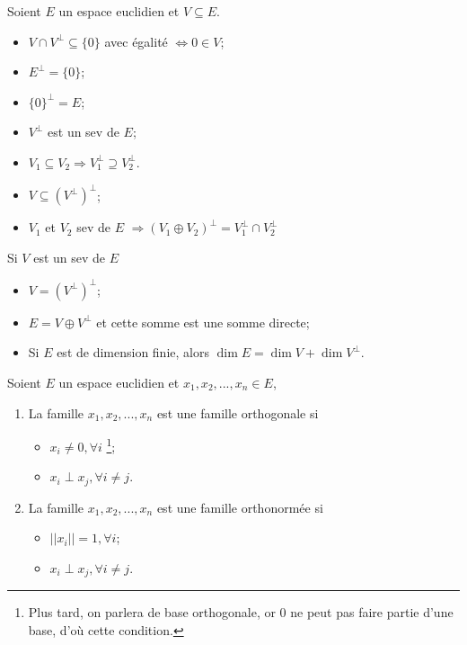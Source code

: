 \begin{myprop}
	Soient $E$ un espace euclidien et $V \subseteq E$.
	\begin{itemize}
		\item $V \cap V^{\perp} \subseteq \{0\}$ avec égalité $\iff 0 \in V$;
		\item $E^{\perp} = \{0\}$;
		\item $\{0\}^{\perp} = E$;
		\item $V^{\perp}$ est un sev de $E$;
		\item $V_1 \subseteq V_2 \Rightarrow V_1^{\perp} \supseteq V_2^{\perp}$.
		\item $V \subseteq \left( V^{\perp} \right) ^{\perp}$;
		\item $V_1$ et $V_2$ sev de $E$ $\Rightarrow (V_1 \oplus V_2)^{\perp} = V_1^{\perp}
					\cap V_2^{\perp}$
	\end{itemize}
	Si $V$ est un sev de $E$
	\begin{itemize}
		\item $V = \left(V^\perp \right)^\perp$;
		\item $E = V \oplus V^{\perp}$ et cette somme est une somme directe;
			\item
			Si $E$ est de dimension finie, alors
			$\dim E = \dim V + \dim V^{\perp}$.
	\end{itemize}
\end{myprop}


\begin{mydef}
	Soient $E$ un espace euclidien et $x_1, x_2,... ,x_n \in E$,
	\begin{enumerate}
		\item La famille $x_1, x_2,... ,x_n$ est une famille orthogonale si
			\begin{itemize}
				\item $x_i \neq 0, \forall i$
				\footnote{Plus tard, on parlera de base orthogonale, or 0 ne peut
				pas faire partie d'une base, d'où cette condition.};
				\item $x_i \perp x_j, \forall i \neq j$.
			\end{itemize}

		\item La famille $x_1, x_2,... ,x_n$ est une famille orthonormée si
			\begin{itemize}
				\item $||x_i|| = 1, \forall i$;
				\item $x_i \perp x_j, \forall i \neq j$.
			\end{itemize}
	\end{enumerate}
\end{mydef}

